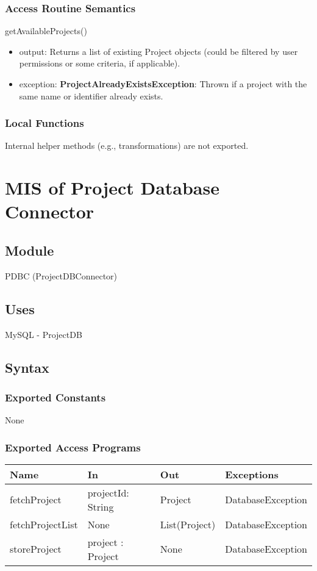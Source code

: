 \documentclass[12pt, titlepage]{article}
\begin{document}
    \subsubsection{Access Routine Semantics}
        \noindent getAvailableProjects()
        \begin{itemize}
            \item output: Returns a list of existing Project objects (could be filtered by user permissions or some criteria, if applicable).
            \item exception: \textbf{ProjectAlreadyExistsException}: Thrown if a project with the same name or identifier already exists. 
        \end{itemize}
    \subsubsection{Local Functions}
        Internal helper methods (e.g., transformations) are not exported.



\section{MIS of Project Database Connector} \label{pdbc} 
    \subsection{Module}
        PDBC (ProjectDBConnector)

    \subsection{Uses}
        MySQL - ProjectDB

    \subsection{Syntax}
    \subsubsection{Exported Constants}
        None

    \subsubsection{Exported Access Programs}
    \begin{center}\begin{tabular}{p{3cm} p{4cm} p{3cm} p{3cm}}
    \hline\textbf{Name} & \textbf{In} & \textbf{Out} & \textbf{Exceptions} \\
    \hline
        fetchProject & projectId: String & Project & DatabaseException \\
        fetchProjectList & None & List(Project) & DatabaseException \\
        storeProject & project : Project & None & DatabaseException \\
    \hline
    \end{tabular}\end{center}
\end{document}
